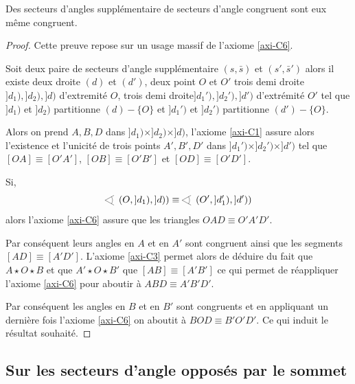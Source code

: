 \begin{lem}\label{lem-secteurssupplementairecongru}
    Des secteurs d'angles supplémentaire de secteurs d'angle congruent sont eux même congruent. 
\begin{proof}
    Cette preuve repose sur un usage massif de l'axiome \ref{axi-C6}.

    Soit deux paire de secteurs d'angle supplémentaire $(s,\bar{s})$ et $(s',\bar{s}')$ alors il existe deux droite $(d)$ et $(d')$, deux point $O$ et $O'$ trois demi droite $]d_1),]d_2),]d)$ d'extremité $O$, trois demi droite$ ]d_1'),]d_2'),]d')$ d'extrémité $O'$ tel que $]d_1)$ et $]d_2)$ partitionne $(d)-\{O\}$ et $]d_1')$ et $]d_2')$ partitionne $(d')-\{O\}$. 

    Alors on prend $A,B,D$ dans $]d_1)\times]d_2)\times]d)$, l'axiome \ref{axi-C1} assure alors l'existence et l'unicité de trois points $A',B',D'$ dans $]d_1')\times]d_2')\times]d')$ tel que $[OA]\equiv[O'A']$, $[OB]\equiv[O'B']$ et $[OD]\equiv[O'D']$.

    Si,
    \begin{equation*}
        \anglesaillant\left(O,]d_1),]d)\right)\equiv \anglesaillant\left(O',]d_1'),]d')\right)
    \end{equation*}
    alors l'axiome \ref{axi-C6} assure que les triangles $OAD\equiv O'A'D'$. 
    
    Par conséquent leurs angles en $A$ et en $A'$ sont congruent ainsi que les segments $[AD]\equiv[A'D']$. L'axiome \ref{axi-C3} permet alors de déduire du fait que $A\star O\star B$ et que $A'\star O\star B'$ que $[AB]\equiv [A'B']$ ce qui permet de réappliquer l'axiome \ref{axi-C6} pour aboutir à $ABD\equiv A'B'D'$.

    Par conséquent les angles en $B$ et en $B'$ sont congruents et en appliquant un dernière fois l'axiome \ref{axi-C6} on aboutit à $BOD\equiv B'O'D'$. Ce qui induit le résultat souhaité.
\end{proof}
\end{lem}

    \subsection{Sur les secteurs d'angle opposés par le sommet}

